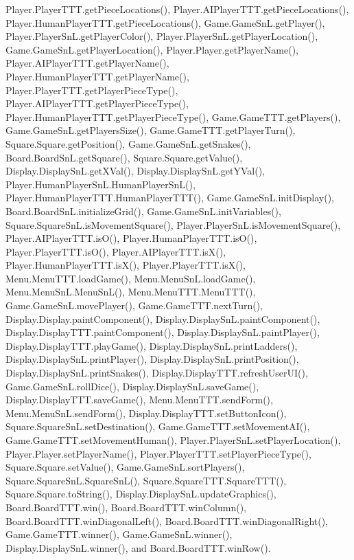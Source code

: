 Player.\+Player\+T\+T\+T.\+get\+Piece\+Locations(), Player.\+A\+I\+Player\+T\+T\+T.\+get\+Piece\+Locations(), Player.\+Human\+Player\+T\+T\+T.\+get\+Piece\+Locations(), Game.\+Game\+Sn\+L.\+get\+Player(), Player.\+Player\+Sn\+L.\+get\+Player\+Color(), Player.\+Player\+Sn\+L.\+get\+Player\+Location(), Game.\+Game\+Sn\+L.\+get\+Player\+Location(), Player.\+Player.\+get\+Player\+Name(), Player.\+A\+I\+Player\+T\+T\+T.\+get\+Player\+Name(), Player.\+Human\+Player\+T\+T\+T.\+get\+Player\+Name(), Player.\+Player\+T\+T\+T.\+get\+Player\+Piece\+Type(), Player.\+A\+I\+Player\+T\+T\+T.\+get\+Player\+Piece\+Type(), Player.\+Human\+Player\+T\+T\+T.\+get\+Player\+Piece\+Type(), Game.\+Game\+T\+T\+T.\+get\+Players(), Game.\+Game\+Sn\+L.\+get\+Players\+Size(), Game.\+Game\+T\+T\+T.\+get\+Player\+Turn(), Square.\+Square.\+get\+Position(), Game.\+Game\+Sn\+L.\+get\+Snakes(), Board.\+Board\+Sn\+L.\+get\+Square(), Square.\+Square.\+get\+Value(), Display.\+Display\+Sn\+L.\+get\+X\+Val(), Display.\+Display\+Sn\+L.\+get\+Y\+Val(), Player.\+Human\+Player\+Sn\+L.\+Human\+Player\+Sn\+L(), Player.\+Human\+Player\+T\+T\+T.\+Human\+Player\+T\+T\+T(), Game.\+Game\+Sn\+L.\+init\+Display(), Board.\+Board\+Sn\+L.\+initialize\+Grid(), Game.\+Game\+Sn\+L.\+init\+Variables(), Square.\+Square\+Sn\+L.\+is\+Movement\+Square(), Player.\+Player\+Sn\+L.\+is\+Movement\+Square(), Player.\+A\+I\+Player\+T\+T\+T.\+is\+O(), Player.\+Human\+Player\+T\+T\+T.\+is\+O(), Player.\+Player\+T\+T\+T.\+is\+O(), Player.\+A\+I\+Player\+T\+T\+T.\+is\+X(), Player.\+Human\+Player\+T\+T\+T.\+is\+X(), Player.\+Player\+T\+T\+T.\+is\+X(), Menu.\+Menu\+T\+T\+T.\+load\+Game(), Menu.\+Menu\+Sn\+L.\+load\+Game(), Menu.\+Menu\+Sn\+L.\+Menu\+Sn\+L(), Menu.\+Menu\+T\+T\+T.\+Menu\+T\+T\+T(), Game.\+Game\+Sn\+L.\+move\+Player(), Game.\+Game\+T\+T\+T.\+next\+Turn(), Display.\+Display.\+paint\+Component(), Display.\+Display\+Sn\+L.\+paint\+Component(), Display.\+Display\+T\+T\+T.\+paint\+Component(), Display.\+Display\+Sn\+L.\+paint\+Player(), Display.\+Display\+T\+T\+T.\+play\+Game(), Display.\+Display\+Sn\+L.\+print\+Ladders(), Display.\+Display\+Sn\+L.\+print\+Player(), Display.\+Display\+Sn\+L.\+print\+Position(), Display.\+Display\+Sn\+L.\+print\+Snakes(), Display.\+Display\+T\+T\+T.\+refresh\+User\+U\+I(), Game.\+Game\+Sn\+L.\+roll\+Dice(), Display.\+Display\+Sn\+L.\+save\+Game(), Display.\+Display\+T\+T\+T.\+save\+Game(), Menu.\+Menu\+T\+T\+T.\+send\+Form(), Menu.\+Menu\+Sn\+L.\+send\+Form(), Display.\+Display\+T\+T\+T.\+set\+Button\+Icon(), Square.\+Square\+Sn\+L.\+set\+Destination(), Game.\+Game\+T\+T\+T.\+set\+Movement\+A\+I(), Game.\+Game\+T\+T\+T.\+set\+Movement\+Human(), Player.\+Player\+Sn\+L.\+set\+Player\+Location(), Player.\+Player.\+set\+Player\+Name(), Player.\+Player\+T\+T\+T.\+set\+Player\+Piece\+Type(), Square.\+Square.\+set\+Value(), Game.\+Game\+Sn\+L.\+sort\+Players(), Square.\+Square\+Sn\+L.\+Square\+Sn\+L(), Square.\+Square\+T\+T\+T.\+Square\+T\+T\+T(), Square.\+Square.\+to\+String(), Display.\+Display\+Sn\+L.\+update\+Graphics(), Board.\+Board\+T\+T\+T.\+win(), Board.\+Board\+T\+T\+T.\+win\+Column(), Board.\+Board\+T\+T\+T.\+win\+Diagonal\+Left(), Board.\+Board\+T\+T\+T.\+win\+Diagonal\+Right(), Game.\+Game\+T\+T\+T.\+winner(), Game.\+Game\+Sn\+L.\+winner(), Display.\+Display\+Sn\+L.\+winner(), and Board.\+Board\+T\+T\+T.\+win\+Row().

